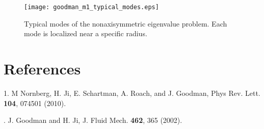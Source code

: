\documentclass[letterpaper]{article}
\begin{document}
\begin{figure}
\begin{center}
\texttt{[image: goodman\_m1\_typical\_modes.eps]}
\caption{Typical modes of the nonaxisymmetric eigenvalue problem.
  Each mode is localized near a specific radius.}
\label{fig:goodmanm1typicalmodes}
\end{center}
\end{figure}


\section{References}
1. M Nornberg, H. Ji, E. Schartman, A. Roach, and J. Goodman, Phys
Rev. Lett. {\bf 104}, 074501 (2010).

. J. Goodman and H. Ji, J. Fluid Mech. {\bf 462}, 365 (2002).
\end{document}
